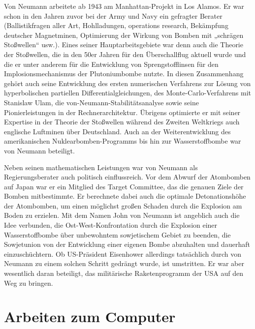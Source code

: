 Von Neumann arbeitete ab 1943 am Manhattan-Projekt in Los Alamos. Er war schon in den Jahren zuvor bei der Army und Navy ein gefragter Berater (Ballistikfragen aller Art, Hohlladungen, operations research, Bekämpfung deutscher Magnetminen, Optimierung der Wirkung von Bomben mit „schrägen Stoßwellen“ usw.). Eines seiner Hauptarbeitsgebiete war denn auch die Theorie der Stoßwellen, die in den 50er Jahren für den Überschallflug aktuell wurde und die er unter anderem für die Entwicklung von Sprengstofflinsen für den Implosionsmechanismus der Plutoniumbombe nutzte. In diesen Zusammenhang gehört auch seine Entwicklung des ersten numerischen Verfahrens zur Lösung von hyperbolischen partiellen Differentialgleichungen, des Monte-Carlo-Verfahrens mit Stanislaw Ulam, die von-Neumann-Stabilitätsanalyse sowie seine Pionierleistungen in der Rechnerarchitektur. Übrigens optimierte er mit seiner Expertise in der Theorie der Stoßwellen während des Zweiten Weltkriegs auch englische Luftminen über Deutschland. Auch an der Weiterentwicklung des amerikanischen Nuklearbomben-Programms bis hin zur Wasserstoffbombe war von Neumann beteiligt.

Neben seinen mathematischen Leistungen war von Neumann als Regierungsberater auch politisch einflussreich. Vor dem Abwurf der Atombomben auf Japan war er ein Mitglied des Target Committee, das die genauen Ziele der Bomben mitbestimmte. Er berechnete dabei auch die optimale Detonationshöhe der Atombomben, um einen möglichst großen Schaden durch die Explosion am Boden zu erzielen. Mit dem Namen John von Neumann ist angeblich auch die Idee verbunden, die Ost-West-Konfrontation durch die Explosion einer Wasserstoffbombe über unbewohntem sowjetischem Gebiet zu beenden, die Sowjetunion von der Entwicklung einer eigenen Bombe abzuhalten und dauerhaft einzuschüchtern. Ob US-Präsident Eisenhower allerdings tatsächlich durch von Neumann zu einem solchen Schritt gedrängt wurde, ist umstritten. Er war aber wesentlich daran beteiligt, das militärische Raketenprogramm der USA auf den Weg zu bringen.

\section{Arbeiten zum Computer}

